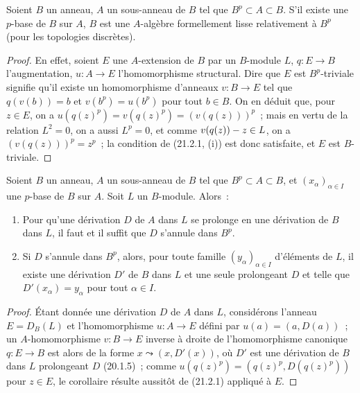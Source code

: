 \begin{corollary}[21.2.2]
\label{0.21.2.2-fr}
Soient $B$ un anneau, $A$ un sous-anneau de $B$ tel que $B^p\subset A\subset B$.
S'il existe une $p$-base de $B$ sur $A$, $B$ est une $A$-algèbre formellement
lisse relativement à $B^p$ (pour les topologies discrètes).
\end{corollary}

\begin{proof}
En effet, soient $E$ une $A$-extension de $B$ par un $B$-module $L$, $q:E\to B$
l'augmentation, $u:A\to E$ l'homomorphisme structural. Dire que $E$ est
$B^p$-triviale signifie qu'il existe un homomorphisme d'anneaux $v:B\to E$
tel que $q(v(b))=b$ et $v(b^p)=u(b^p)$ pour tout $b\in B$. On en déduit que,
pour $z\in E$, on a $u(q(z)^p)=v(q(z)^p)=(v(q(z)))^p$~; mais en vertu de
la relation $L^2=0$, on a aussi $L^p=0$, et comme $v(q(z))- z\in L$, on a
$(v(q(z)))^p=z^p$~; la condition de (21.2.1, (i)) est donc satisfaite, et
$E$ est $B$-triviale.
\end{proof}

\begin{corollary}[21.2.3]
\label{0.21.2.3-fr}
Soient $B$ un anneau, $A$ un sous-anneau de $B$ tel que $B^p\subset A\subset B$,
et $\left(x_\alpha\right)_{\alpha\in I}$ une $p$-base de $B$ sur $A$. Soit
$L$ un $B$-module. Alors~:
\begin{enumerate}
  \item[\textup{(i)}] Pour qu'une dérivation $D$ de $A$ dans $L$ se prolonge en une
  dérivation de $B$ dans $L$, il faut et il suffit que $D$ s'annule dans $B^p$.
  \item[\textup{(ii)}] Si $D$ s'annule dans $B^p$, alors, pour toute famille
  $(y_\alpha)_{\alpha\in I}$ d'éléments de $L$, il existe une dérivation
  $D'$ de $B$ dans $L$ et une seule prolongeant $D$ et telle que
  $D'(x_\alpha)=y_\alpha$ pour tout $\alpha\in I$.
\end{enumerate}
\end{corollary}

\begin{proof}
Étant donnée une dérivation $D$ de $A$ dans $L$, considérons l'anneau
$E=D_B(L)$ et l'homomorphisme $u:A\to E$ défini par $u(a)=(a,D(a))$~; un
$A$-homomorphisme $v:B\to E$ inverse à droite de l'homomorphisme canonique
$q:E\to B$ est alors de la forme $x\leadsto(x,D'(x))$, où $D'$ est une
dérivation de $B$ dans $L$ prolongeant $D$ (20.1.5)~; comme
$u(q(z)^p)=(q(z)^p,D(q(z)^p))$ pour $z\in E$, le corollaire résulte aussitôt
de (21.2.1) appliqué à $E$.
\end{proof}

